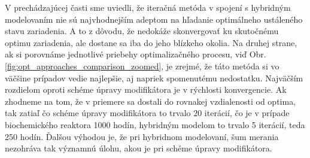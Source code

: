 V prechádzajúcej časti sme uviedli, že iteračná metóda v spojení s hybridným modelovaním nie sú najvhodnejším adeptom na hľadanie optimálneho ustáleného stavu zariadenia. A to z dôvodu, že nedokáže skonvergovať ku skutočnému optimu zariadenia, ale dostane sa iba do jeho blízkeho okolia. Na druhej strane, ak si porovnáme jednotlivé priebehy optimalizačného procesu, viď Obr. \ref{fig:opt_approaches_comparison_zoomed}, je zrejmé, že táto metóda si vo väčšine prípadov vedie najlepšie, aj napriek spomenutému nedostatku. Najväčším rozdielom oproti schéme úpravy modifikátora je v rýchlosti konvergencie. Ak zhodneme na tom, že v priemere sa dostali do rovnakej vzdialenosti od optima, tak zatiaľ čo schéme úpravy modifikátora to trvalo 20 iterácií, čo je v prípade biochemického reaktora 1000 hodín, hybridným modelom to trvalo 5 iterácií, teda 250 hodín. Ďalšou výhodou je, že pri hybridnom modelovaní, šum merania nezohráva tak významnú úlohu, akou je pri schéme úpravy modifikátora. 